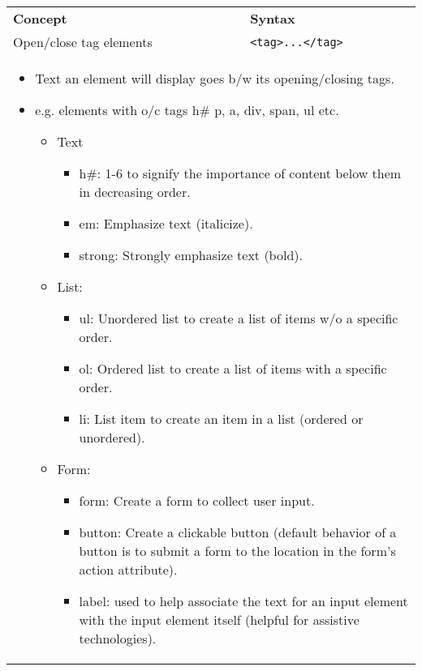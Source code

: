 \begin{summary}
    \begin{center}
        \begin{tabular}{ll}
            \textbf{Concept} & \textbf{Syntax} \\ 
            Open/close tag elements & \texttt{<tag>...</tag>} \\
            \multicolumn{2}{p{\linewidth}}{\begin{itemize}
                \item Text an element will display goes b/w its opening/closing tags. 
                \item e.g. elements with o/c tags h\# p, a, div, span, ul etc.
                \begin{itemize}
                    \item Text
                    \begin{itemize}
                        \item h\#: 1-6 to signify the importance of content below them in decreasing order.
                        \item em: Emphasize text (italicize).
                        \item strong: Strongly emphasize text (bold).
                    \end{itemize}
                    \item List:
                    \begin{itemize}
                        \item ul: Unordered list to create a list of items w/o a specific order.
                        \item ol: Ordered list to create a list of items with a specific order.
                        \item li: List item to create an item in a list (ordered or unordered).
                    \end{itemize}
                    \item Form:
                    \begin{itemize}
                        \item form: Create a form to collect user input.
                        \item button: Create a clickable button (default behavior of a button is to submit a form to the location in the form's action attribute).
                        \item label: used to help associate the text for an input element with the input element itself (helpful for assistive technologies).

\end{itemize}
\end{itemize}
\end{itemize}}
\end{tabular}
\end{center}
\end{summary}
